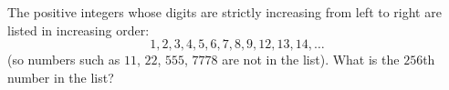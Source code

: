 The positive integers whose digits are strictly increasing from left to right are listed in increasing order:
\[
1,2,3,4,5,6,7,8,9,12,13,14,\dots
\]
(so numbers such as $11$, $22$, $555$, $7778$ are not in the list). What is the $256$th number in the list?
